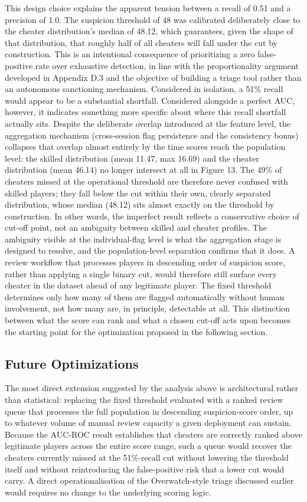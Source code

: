 This design choice explains the apparent tension between a recall of 0.51 and a precision of 1.0. The suspicion threshold of 48 was calibrated deliberately close to the cheater distribution's median of 48.12, which guarantees, given the shape of that distribution, that roughly half of all cheaters will fall under the cut by construction. This is an intentional consequence of prioritizing a zero false-positive rate over exhaustive detection, in line with the proportionality argument developed in Appendix D.3 and the objective of building a triage tool rather than an autonomous sanctioning mechanism. Considered in isolation, a 51\% recall would appear to be a substantial shortfall. Considered alongside a perfect AUC, however, it indicates something more specific about where this recall shortfall actually sits. Despite the deliberate overlap introduced at the feature level, the aggregation mechanism (cross-session flag persistence and the consistency bonus) collapses that overlap almost entirely by the time scores reach the population level: the skilled distribution (mean 11.47, max 16.69) and the cheater distribution (mean 46.14) no longer intersect at all in Figure 13. The 49\% of cheaters missed at the operational threshold are therefore never confused with skilled players; they fall below the cut within their own, clearly separated distribution, whose median (48.12) sits almost exactly on the threshold by construction. In other words, the imperfect result reflects a conservative choice of cut-off point, not an ambiguity between skilled and cheater profiles. The ambiguity visible at the individual-flag level is what the aggregation stage is designed to resolve, and the population-level separation confirms that it does. A review workflow that processes players in descending order of suspicion score, rather than applying a single binary cut, would therefore still surface every cheater in the dataset ahead of any legitimate player. The fixed threshold determines only how many of them are flagged automatically without human involvement, not how many are, in principle, detectable at all. This distinction between what the score can rank and what a chosen cut-off acts upon becomes the starting point for the optimization proposed in the following section.

\subsection{Future Optimizations}
\label{sec:three:four:two}
The most direct extension suggested by the analysis above is architectural rather than statistical: replacing the fixed threshold evaluated with a ranked review queue that processes the full population in descending suspicion-score order, up to whatever volume of manual review capacity a given deployment can sustain. Because the AUC-ROC result establishes that cheaters are correctly ranked above legitimate players across the entire score range, such a queue would recover the cheaters currently missed at the 51\%-recall cut without lowering the threshold itself and without reintroducing the false-positive risk that a lower cut would carry. A direct operationalisation of the Overwatch-style triage discussed earlier would requires no change to the underlying scoring logic.

